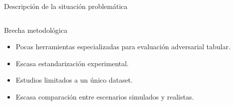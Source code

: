 \documentclass[aspectratio=169, 8pt]{beamer}
\begin{document}
\begin{frame}{Descripción de la situación problemática}
\begin{columns}
\begin{block}{Brecha metodológica}
\begin{itemize}
\item Pocas herramientas especializadas
para evaluación adversarial tabular.

\item Escasa estandarización experimental.

\item Estudios limitados a un único dataset.

\item Escasa comparación entre escenarios
simulados y realistas.

\end{itemize}

\end{block}

\end{columns}

\end{frame}
\end{document}
